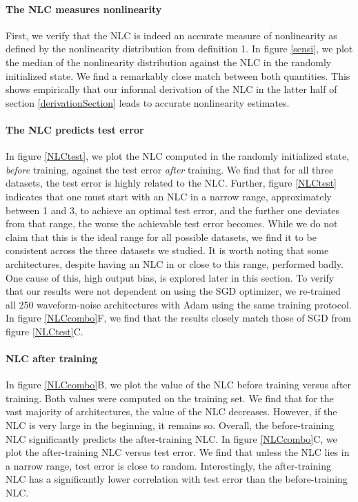 \documentclass{article} %
\begin{document}
\paragraph{The NLC measures nonlinearity} First, we verify that the NLC is indeed an accurate measure of nonlinearity as defined by the nonlinearity distribution from definition 1. In figure \ref{sensi}, we plot the median of the nonlinearity distribution against the NLC in the randomly initialized state. We find a remarkably close match between both quantities. This shows empirically that our informal derivation of the NLC in the latter half of section \ref{derivationSection} leads to accurate nonlinearity estimates. 


\paragraph{The NLC predicts test error} In figure \ref{NLCtest}, we plot the NLC computed in the randomly initialized state, {\it before} training, against the test error {\it after} training. We find that for all three datasets, the test error is highly related to the NLC. Further, figure \ref{NLCtest} indicates that one must start with an NLC in a narrow range, approximately between 1 and 3, to achieve an optimal test error, and the further one deviates from that range, the worse the achievable test error becomes. While we do not claim that this is the ideal range for all possible datasets, we find it to be consistent across the three datasets we studied. It is worth noting that some architectures, despite having an NLC in or close to this range, performed badly. One cause of this, high output bias, is explored later in this section. To verify that our results were not dependent on using the SGD optimizer, we re-trained all 250 waveform-noise architectures with Adam using the same training protocol. In figure \ref{NLCcombo}F, we find that the results closely match those of SGD from figure \ref{NLCtest}C.

\paragraph{NLC after training} In figure \ref{NLCcombo}B, we plot the value of the NLC before training versus after training. Both values were computed on the training set. We find that for the vast majority of architectures, the value of the NLC decreases. However, if the NLC is very large in the beginning, it remains so. Overall, the before-training NLC significantly predicts the after-training NLC. In figure \ref{NLCcombo}C, we plot the after-training NLC versus test error. We find that unless the NLC lies in a narrow range, test error is close to random. Interestingly, the after-training NLC has a significantly lower correlation with test error than the before-training NLC.
\end{document}
